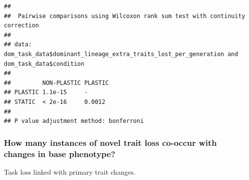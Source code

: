 \documentclass[]{book}
\newenvironment{Shaded}{\begin{snugshade}}{\end{snugshade}}
\newcommand{\DataTypeTok}[1]{\textcolor[rgb]{0.13,0.29,0.53}{#1}}
\newcommand{\FloatTok}[1]{\textcolor[rgb]{0.00,0.00,0.81}{#1}}
\newcommand{\KeywordTok}[1]{\textcolor[rgb]{0.13,0.29,0.53}{\textbf{#1}}}
\newcommand{\NormalTok}[1]{#1}
\newcommand{\OperatorTok}[1]{\textcolor[rgb]{0.81,0.36,0.00}{\textbf{#1}}}
\newcommand{\OtherTok}[1]{\textcolor[rgb]{0.56,0.35,0.01}{#1}}
\newcommand{\StringTok}[1]{\textcolor[rgb]{0.31,0.60,0.02}{#1}}
\begin{document}
\begin{Shaded}
\end{Shaded}

\begin{verbatim}
## 
##  Pairwise comparisons using Wilcoxon rank sum test with continuity correction 
## 
## data:  dom_task_data$dominant_lineage_extra_traits_lost_per_generation and dom_task_data$condition 
## 
##         NON-PLASTIC PLASTIC
## PLASTIC 1.1e-15     -      
## STATIC  < 2e-16     0.0012 
## 
## P value adjustment method: bonferroni
\end{verbatim}

\hypertarget{how-many-instances-of-novel-trait-loss-co-occur-with-changes-in-base-phenotype}{%
\subsubsection{How many instances of novel trait loss co-occur with changes in base phenotype?}\label{how-many-instances-of-novel-trait-loss-co-occur-with-changes-in-base-phenotype}}

Task loss linked with primary trait changes.
\end{document}
